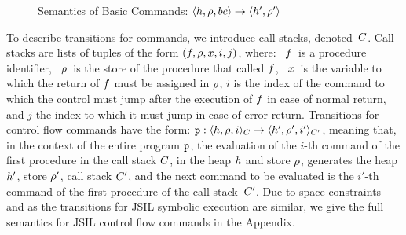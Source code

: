 \begin{figure}[ht!]
{}
\vspace*{-0.5cm}
\caption{Semantics of \jsil Basic Commands: {$\semtrans{\heap, \store, \bcmd}{\heap', \store'}$}\label{fig:sem:basic:commands}}
\vspace*{-0.5cm}
\end{figure}

To describe transitions for \jsil commands, we introduce call stacks, denoted~$C$. Call stacks are lists of tuples of the form $(f, \rho, x, i, j)$, where: 
~$f$~is a procedure identifier, 
~$\rho$~is the store of the procedure that called $f$, ~$x$~is 
the variable to which the return of $f$ must be assigned in $\rho$,  $i$ is the index 
of the command to which the control must jump after the execution of $f$ in 
case of normal return, and  $j$ the index to which it must jump in case of 
error return. Transitions for control flow commands have the form:  $\semtrans[\prog]{\heap, \store, i}{\heap', \store', i'}[\ctx][\ctx']$, meaning that, in the context of the entire program $\mathtt{p}$, the evaluation of the $i$-th command of the first procedure in the call stack $C$, in
the heap $h$ and store $\rho$, generates the heap $h'$, store $\rho'$, call stack $C'$,   
and the next command to be evaluated is the $i'$-th command of the first procedure of the call stack~$C'$. Due to space constraints and as the transitions for JSIL symbolic execution are  similar, we give the full semantics for JSIL control flow commands in the Appendix. 

